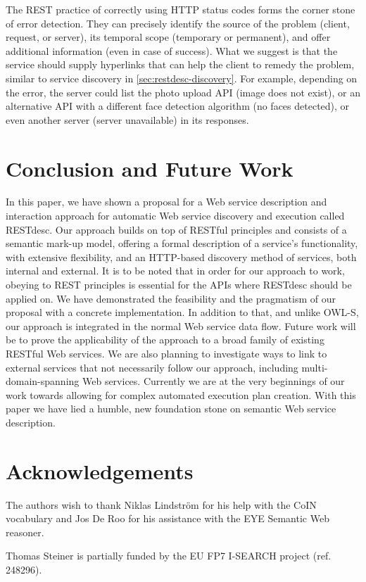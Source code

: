 \documentclass[runningheads,a4paper, twocolumn]{llncs}
\begin{document}
The REST practice of correctly using HTTP status codes forms the corner stone of error detection. They can precisely identify the source of the problem (client, request, or server), its temporal scope (temporary or permanent), and offer additional information (even in case of success). What we suggest is that the service should supply hyperlinks that can help the client to remedy the problem, similar to service discovery in \autoref{sec:restdesc-discovery}. For example, depending on the error, the server could list the photo upload API (image does not exist), or an alternative API with a different face detection algorithm (no faces detected), or even another server (server unavailable) in its responses.

\section{Conclusion and Future Work} \label{sec:conclusion-and-future-work}
In this paper, we have shown a proposal for a Web service description and interaction approach for automatic Web service discovery and execution called RESTdesc. Our approach builds on top of RESTful principles and consists of a semantic mark-up model, offering a formal description of a service's functionality, with extensive flexibility, and an HTTP-based discovery method of services, both internal and external. It is to be noted that in order for our approach to work, obeying to REST principles is essential for the APIs where RESTdesc should be applied on. We have demonstrated the feasibility and the pragmatism of our proposal with a concrete implementation. In addition to that, and unlike OWL-S, our approach is integrated in the normal Web service data flow. Future work will be to prove the applicability of the approach to a broad family of existing RESTful Web services. We are also planning to investigate ways to link to external services that not necessarily follow our approach, including multi-domain-spanning Web services. Currently we are at the very beginnings of our work towards allowing for complex automated execution plan creation. With this paper we have lied a humble, new foundation stone on semantic Web service description.

\section*{Acknowledgements} \label{sec:acknowledgements}
The authors wish to thank Niklas Lindstr\"om for his help with the CoIN vocabulary and Jos De Roo for his assistance with the EYE Semantic Web reasoner.

{Thomas Steiner is partially funded by the EU FP7 I-SEARCH project (ref. 248296).}{}

\renewcommand{\ttdefault}{cmvtt}
\renewcommand\UrlFont\tt



\end{document}
